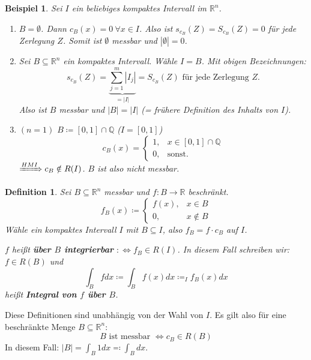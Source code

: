 \documentclass[12pt]{extreport} %
\newcommand{\Q}{\mathbb{Q}}
\newcommand{\R}{\mathbb{R}}
\theoremstyle{named}
\theoremstyle{nnamed}
\theoremstyle{itshape}
\newtheorem*{definition}{Definition}
\theoremstyle{normal}
\newtheorem*{beispiel*}{Beispiel}
\begin{document}
\begin{beispiel*}
	Sei $I$ ein beliebiges kompaktes Intervall im $\R^{n}$.
	\begin{enumerate}
		\item $B = \emptyset$. Dann $c_{B}(x) = 0 ~\forall x \in I$. Also ist $s_{c_{B}}(Z) = S_{c_{B}}(Z) = 0$ für jede Zerlegung $Z$. Somit ist $\emptyset$ messbar und $|\emptyset| = 0$.
		\item Sei $B \subseteq \R^{n}$ ein kompaktes Intervall. Wähle $I = B$. Mit obigen Bezeichnungen:
			$$ s_{c_{B}}(Z) = \underbrace{\sum_{j=1}^{m} |I_{j}|}_{= |I|} = S_{c_{B}}(Z) \text{ für jede Zerlegung } Z. $$
			Also ist $B$ messbar und $|B| = |I|$ (= frühere Definition des Inhalts von $I$).
		\item $(n=1)$ $B \coloneqq [0, 1] \cap \Q$ ($I = [0, 1]$)
			$$ c_{B}(x) = \begin{cases} 1, & x \in [0, 1] \cap \Q \\ 0, & \text{sonst}. \end{cases} $$
			$\xRightarrow[]{HM I} c_{B} \notin R(I)$. $B$ ist also nicht messbar.
	\end{enumerate}
\end{beispiel*}

 
\begin{definition}
	Sei $B \subseteq \R^{n}$ messbar und $f \colon B \rightarrow \R$ beschränkt.
		$$ f_{B}(x) \coloneqq \begin{cases} f(x), & x \in B \\ 0, & x \notin B \end{cases} $$
	Wähle ein kompaktes Intervall $I$ mit $B \subseteq I$, also $f_{B} = f \cdot c_{B}$ auf $I$.
	
	\bigskip
	
	$f$ hei{\ss}t \textbf{über $B$ integrierbar} $:\iff f_{B} \in R(I)$. In diesem Fall schreiben wir: $f \in R(B)$ und
		$$ \int_{B} f dx \coloneqq \int_{B} f(x) dx \coloneqq_{I} f_{B}(x) dx $$
	hei{\ss}t \textbf{Integral von $f$ über $B$}. 
\end{definition}

Diese Definitionen sind unabhängig von der Wahl von $I$. Es gilt also für eine beschränkte Menge $B \subseteq \R^{n}$:
	$$ B \text{ ist messbar } \iff c_{B} \in R(B) $$
In diesem Fall: $|B| = \int_{B} 1 dx \eqqcolon \int_{B} dx$.
\end{document}
